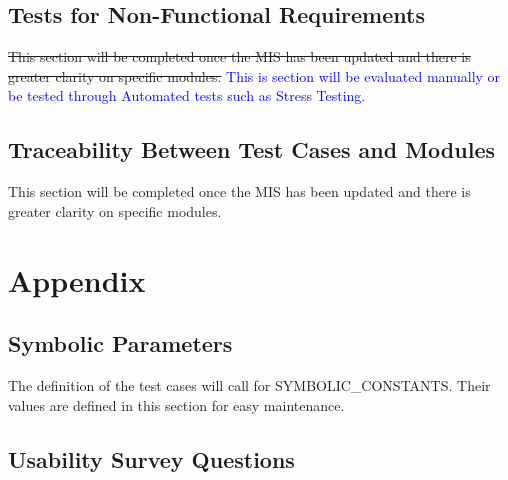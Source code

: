 \documentclass[12pt, titlepage]{article}
\begin{document}
\subsection{Tests for Non-Functional Requirements}

\sout{This section will be completed once the MIS has been updated and there is greater clarity on specific modules. }
\textcolor{blue}{
This is section will be evaluated manually or be tested through Automated tests such as Stress Testing.
}

\subsection{Traceability Between Test Cases and Modules}
This section will be completed once the MIS has been updated and there is greater clarity on specific modules.


				




\newpage

\section{Appendix}

\subsection{Symbolic Parameters}

The definition of the test cases will call for SYMBOLIC\_CONSTANTS.
Their values are defined in this section for easy maintenance.

\subsection{Usability Survey Questions}
\end{document}
